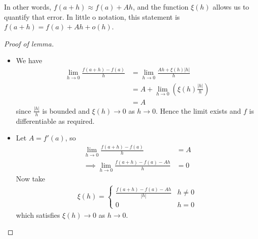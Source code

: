 \documentclass{../../template/note}
\begin{document}
    \begin{remark*}
        In other words, \(f(a+h) \approx f(a) + Ah\), and the function \(\xi(h)\) allows us to quantify that error. In little o notation, this statement is \(f(a+h) = f(a) + Ah + o(h)\).
    \end{remark*}
    
    \begin{proof}[Proof of lemma]
        \begin{itemize}
            \item[\(\impliedby\)] We have
            \begin{align*}
                \lim_{h \to 0} \frac{f(a+h)-f(a)}h &= \lim_{h \to 0}\frac{Ah + \xi(h) |h|}{h} \\
                &= A + \lim_{h \to 0} \left(\xi(h) \frac{|h|}{h}\right) \\
                &= A
            \end{align*}
            since \(\frac{|h|}{h}\) is bounded and \(\xi(h) \to 0\) as \(h \to 0\). Hence the limit exists and \(f\) is differentiable as required.
            \item[\(\implies\)] Let \(A = f'(a)\), so
            \begin{align*}
                \lim_{h \to 0} \frac{f(a+h)-f(a)}{h} &= A \\
                \implies \lim_{h \to 0} \frac{f(a+h)-f(a)-Ah}{h} &= 0
            \end{align*}
            Now take
            \begin{align*}
                \xi(h) = \begin{cases}
                    \frac{f(a+h)-f(a)-Ah}{|h|} & h \neq 0 \\
                    0 & h = 0
                \end{cases}
            \end{align*}
            which satisfies \(\xi(h) \to 0\) as \(h \to 0\).
        \end{itemize}
    \end{proof}
    
\end{document}

